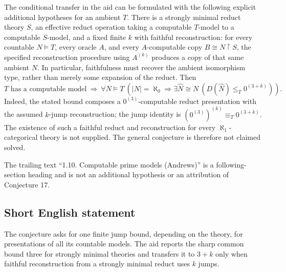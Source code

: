 \documentclass[11pt]{article}
\begin{document}
The conditional transfer in the aid can be formulated with the following explicit additional hypotheses for an ambient \(T\). There is a strongly minimal reduct theory \(S\), an effective reduct operation taking a computable \(T\)-model to a computable \(S\)-model, and a fixed finite \(k\) with faithful reconstruction: for every countable \(N\models T\), every oracle \(A\), and every \(A\)-computable copy \(B\cong N\!\upharpoonright\!S\), the specified reconstruction procedure using \(A^{(k)}\) produces a copy of that same ambient \(N\). In particular, faithfulness must recover the ambient isomorphism type, rather than merely some expansion of the reduct. Then
\[
 T\text{ has a computable model}
 \ \Longrightarrow\
 \forall N\models T\ (|N|=\aleph_0\Longrightarrow
 \exists\widehat N\cong N\ (D(\widehat N)\le_T0^{(3+k)})).
\]
Indeed, the stated bound composes a \(0^{(3)}\)-computable reduct presentation with the assumed \(k\)-jump reconstruction; the jump identity is \((0^{(3)})^{(k)}\equiv_T0^{(3+k)}\). The existence of such a faithful reduct and reconstruction for every \(\aleph_1\)-categorical theory is not supplied. The general conjecture is therefore not claimed solved.

The trailing text ``1.10. Computable prime models (Andrews)'' is a following-section heading and is not an additional hypothesis or an attribution of Conjecture 17.
\subsection{Short English statement}
The conjecture asks for one finite jump bound, depending on the theory, for presentations of all its countable models. The aid reports the sharp common bound three for strongly minimal theories and transfers it to \(3+k\) only when faithful reconstruction from a strongly minimal reduct uses \(k\) jumps.
\end{document}

